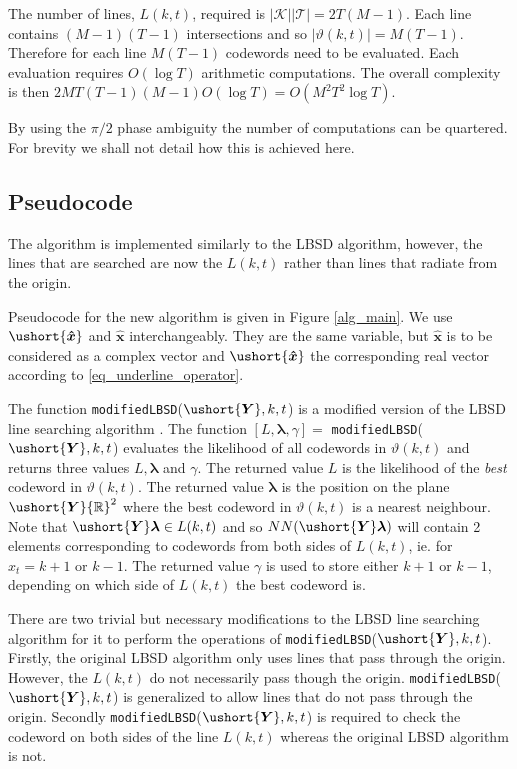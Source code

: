 \documentclass[conference]{IEEEtran}
\newcommand{\reals}{{\mathbb R}}
\newcommand{\uY}{\ushort{\bm{Y}}}
\newcommand{\uhx}{\ushort{\bm{\hat{x}}}}
\begin{document}
The number of lines, $L(k,t)$, required is $|{\mathcal K}||{\mathcal T}| = 2T(M-1)$.  Each line contains $(M-1)(T-1)$ intersections and so $|\vartheta(k,t)| = M(T-1)$.  Therefore for each line $M(T-1)$ codewords need to be evaluated.  Each evaluation requires $O(\log{T})$ arithmetic computations.  The overall complexity is then $2 MT(T-1)(M-1) O(\log{T}) = O(M^2T^2\log{T})$.

By using the $\pi/2$ phase ambiguity the number of computations can be quartered.  For brevity we shall not detail how this is achieved here.

\subsection{Pseudocode}

The algorithm is implemented similarly to the LBSD algorithm, however, the lines that are searched are now the $L(k,t)$ rather than lines that radiate from the origin.

Pseudocode for the new algorithm is given in Figure \ref{alg_main}.  We use $\uhx$ and $\bm{\hat{x}}$ interchangeably.  They are the same variable, but $\bm{\hat{x}}$ is to be considered as a complex vector and $\uhx$ the corresponding real vector according to \eqref{eq_underline_operator}.
 
The function \texttt{modifiedLBSD}($\uY, k,t$) is a modified version of the LBSD line searching algorithm \cite{Ryan2007}. The function $[L,\bm{\lambda},\gamma] = $ \texttt{modifiedLBSD}($\uY, k,t$) evaluates the likelihood of all codewords in $\vartheta(k,t)$ and returns three values $L, \bm{\lambda}$ and $\gamma$.  The returned value $L$ is the likelihood of the \emph{best} codeword in $\vartheta(k,t)$.  The returned value $\bm{\lambda}$ is the position on the plane $\uY\reals^2$ where the best codeword in $\vartheta(k,t)$ is a nearest neighbour.  Note that $\uY \bm{\lambda} \in L(k,t)$ and so $NN(\uY \bm{\lambda})$ will contain 2 elements corresponding to codewords from both sides of $L(k,t)$, ie. for $x_t = k+1$ or $k-1$.  The returned value $\gamma$ is used to store either $k+1$ or $k-1$, depending on which side of $L(k,t)$ the best codeword is.

There are two trivial but necessary modifications to the LBSD line searching algorithm for it to perform the operations of \texttt{modifiedLBSD}($\uY, k,t$).  Firstly, the original LBSD algorithm only uses lines that pass through the origin.  However, the $L(k,t)$ do not necessarily pass though the origin.  \texttt{modifiedLBSD}($\uY, k,t$) is generalized to allow lines that do not pass through the origin.  Secondly \texttt{modifiedLBSD}($\uY, k,t$) is required to check the codeword on both sides of the line $L(k,t)$ whereas the original LBSD algorithm is not.
\end{document}
